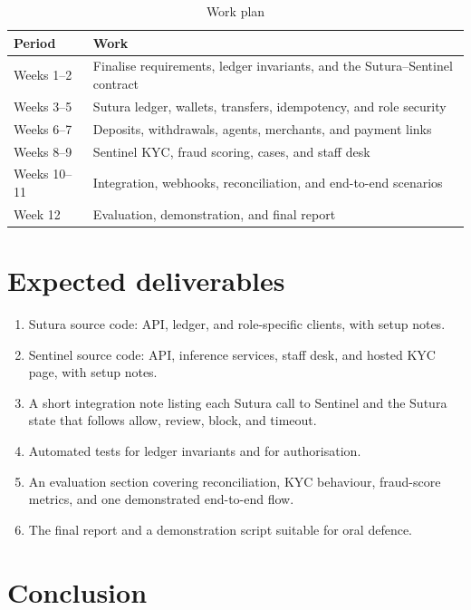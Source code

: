 \documentclass[12pt,a4paper]{article}
\begin{document}
\begin{table}[ht]
\centering
\caption{Work plan}
\label{tab:plan}
\small
\begin{tabularx}{\textwidth}{@{}l X@{}}
\toprule
\textbf{Period} & \textbf{Work} \\
\midrule
Weeks 1--2 &
Finalise requirements, ledger invariants, and the Sutura--Sentinel contract \\
Weeks 3--5 &
Sutura ledger, wallets, transfers, idempotency, and role security \\
Weeks 6--7 &
Deposits, withdrawals, agents, merchants, and payment links \\
Weeks 8--9 &
Sentinel KYC, fraud scoring, cases, and staff desk \\
Weeks 10--11 &
Integration, webhooks, reconciliation, and end-to-end scenarios \\
Week 12 &
Evaluation, demonstration, and final report \\
\bottomrule
\end{tabularx}
\end{table}

\section{Expected deliverables}

\begin{enumerate}
  \item Sutura source code: API, ledger, and role-specific clients, with setup notes.
  \item Sentinel source code: API, inference services, staff desk, and hosted KYC page, with setup notes.
  \item A short integration note listing each Sutura call to Sentinel and the Sutura state that follows allow, review, block, and timeout.
  \item Automated tests for ledger invariants and for authorisation.
  \item An evaluation section covering reconciliation, KYC behaviour, fraud-score metrics, and one demonstrated end-to-end flow.
  \item The final report and a demonstration script suitable for oral defence.
\end{enumerate}

\section{Conclusion}
\end{document}
